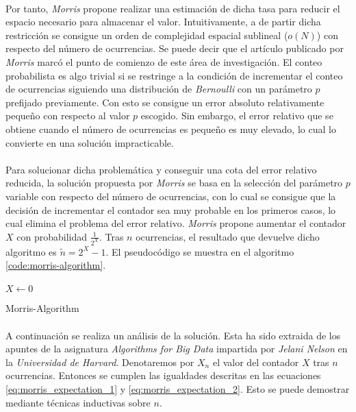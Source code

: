 \documentclass{subfiles}
\begin{document}
      \paragraph{}
      Por tanto, \emph{Morris} propone realizar una estimación de dicha tasa para reducir el espacio necesario para almacenar el valor. Intuitivamente, a de partir dicha restricción se consigue un orden de complejidad espacial sublineal ($o(N)$) con respecto del número de ocurrencias. Se puede decir que el artículo publicado por \emph{Morris} marcó el punto de comienzo de este área de investigación. El conteo probabilista es algo trivial si se restringe a la condición de incrementar el conteo de ocurrencias siguiendo una distribución de \emph{Bernoulli} con un parámetro $p$ prefijado previamente. Con esto se consigue un error absoluto relativamente pequeño con respecto al valor $p$ escogido. Sin embargo, el error relativo que se obtiene cuando el número de ocurrencias es pequeño es muy elevado, lo cual lo convierte en una solución impracticable.

      \paragraph{}
      Para solucionar dicha problemática y conseguir una cota del error relativo reducida, la solución propuesta por \emph{Morris} se basa en la selección del parámetro $p$ variable con respecto del número de ocurrencias, con lo cual se consigue que la decisión de incrementar el contador sea muy probable en los primeros casos, lo cual elimina el problema del error relativo. \emph{Morris} propone aumentar el contador $X$ con probabilidad $\frac{1}{2^X}$. Tras $n$ ocurrencias, el resultado que devuelve dicho algoritmo es $\widetilde{n} = 2^X -1$. El pseudocódigo se muestra en el algoritmo \ref{code:morris-algorithm}.

      \paragraph{}
      \begin{algorithm}[h]
        \SetAlgoLined
        $X \gets 0$\;
        \caption{Morris-Algorithm}
        \label{code:morris-algorithm}
      \end{algorithm}

      \paragraph{}
      A continuación se realiza un análisis de la solución. Esta ha sido extraida de los apuntes de la asignatura \emph{Algorithms for Big Data} \cite{bigdata2015jelani} impartida por \emph{Jelani Nelson} en la \emph{Universidad de Harvard}. Denotaremos por $X_n$ el valor del contador $X$ tras $n$ ocurrencias. Entonces se cumplen las igualdades descritas en las ecuaciones \eqref{eq:morris_expectation_1} y \eqref{eq:morris_expectation_2}. Esto se puede demostrar mediante técnicas inductivas sobre $n$.
\end{document}
